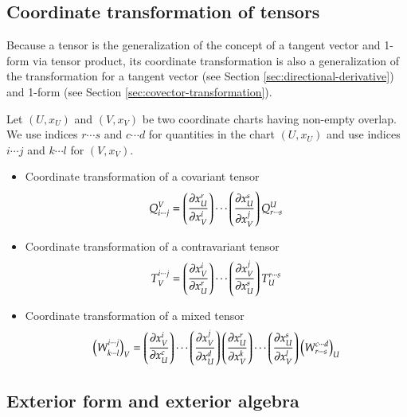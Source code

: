 \documentclass[11pt, a4paper]{book}
\begin{document}
\subsection{Coordinate transformation of tensors}

Because a tensor is the generalization of the concept of a tangent vector and 1-form via
tensor product, its coordinate transformation is also a generalization of the
transformation for a tangent vector (see Section \ref{sec:directional-derivative}) and
1-form (see Section \ref{sec:covector-transformation}).

Let $(U,x_U)$ and $(V,x_V)$ be two coordinate charts having non-empty overlap. We use
indices $r\cdots s$ and $c\cdots d$ for quantities in the chart $(U,x_U)$ and use indices
$i\cdots j$ and $k\cdots l$ for $(V,x_V)$.
\begin{itemize}
\item Coordinate transformation of a covariant tensor
  \begin{equation}
    \label{eq:covariant-tensor-transform}
    Q_{i\cdots j}^V = \left( \frac{\partial x_U^r}{\partial x_V^i} \right) \cdots \left(
      \frac{\partial x_U^s}{\partial x_V^j} \right) Q_{r \cdots s}^U
  \end{equation}
\item Coordinate transformation of a contravariant tensor
  \begin{equation}
    \label{eq:contravariant-tensor-transform}
    T_V^{i \cdots j} = \left( \frac{\partial x_V^i}{\partial x_U^r} \right) \cdots \left(
      \frac{\partial x_V^j}{\partial x_U^s} \right) T_U^{r \cdots s}
  \end{equation}
\item Coordinate transformation of a mixed tensor
  \begin{equation}
    \label{eq:mixed-tensor-transform}
    \left( W^{i \cdots j}_{k \cdots l} \right)_V = \left( \frac{\partial x_V^i}{\partial x_U^c} \right)
    \cdots \left( \frac{\partial x_V^j}{\partial x_U^d} \right) \left( \frac{\partial
        x_U^r}{\partial x_V^k} \right) \cdots \left( \frac{\partial x_U^s}{\partial x_V^l}
    \right) \left( W^{c \cdots d}_{r \cdots s} \right)_U
  \end{equation}
\end{itemize}

\subsection{Exterior form and exterior algebra}
\end{document}
